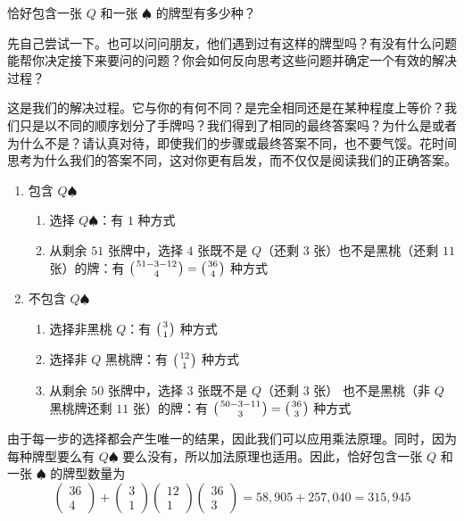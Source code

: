 \begin{example}

    恰好包含一张 $Q$ 和一张 $\spadesuit$ 的牌型有多少种？

    先自己尝试一下。也可以问问朋友，他们遇到过有这样的牌型吗？有没有什么问题能帮你决定接下来要问的问题？你会如何反向思考这些问题并确定一个有效的解决过程？

    这是我们的解决过程。它与你的有何不同？是完全相同还是在某种程度上等价？我们只是以不同的顺序划分了手牌吗？我们得到了相同的最终答案吗？为什么是或者为什么不是？请认真对待，即使我们的步骤或最终答案不同，也不要气馁。花时间思考为什么我们的答案不同，这对你更有启发，而不仅仅是阅读我们的正确答案。
    \begin{enumerate}
        \item 包含 $Q\spadesuit$
              \begin{enumerate}[label=(\alph*)]
                  \item 选择 $Q\spadesuit$：有 $1$ 种方式
                  \item 从剩余 $51$ 张牌中，选择 $4$ 张既不是 $Q$（还剩 $3$ 张）也不是黑桃（还剩 $11$ 张）的牌：有 $\big({51-3-12 \atop 4}\big)=\big({36 \atop 4}\big)$ 种方式
              \end{enumerate}
        \item 不包含 $Q\spadesuit$
              \begin{enumerate}[label=(\alph*)]
                  \item 选择非黑桃 $Q$：有 $\big({3 \atop 1}\big)$ 种方式
                  \item 选择非 $Q$ 黑桃牌：有 $\big({12 \atop 1}\big)$ 种方式
                  \item 从剩余 $50$ 张牌中，选择 $3$ 张既不是 $Q$（还剩 $3$ 张） 也不是黑桃（非 $Q$ 黑桃牌还剩 $11$ 张）的牌：有 $\big({50-3-11 \atop 3}\big)=\big({36 \atop 3}\big)$ 种方式
              \end{enumerate}
    \end{enumerate}
    由于每一步的选择都会产生唯一的结果，因此我们可以应用乘法原理。同时，因为每种牌型要么有 $Q\spadesuit$ 要么没有，所以加法原理也适用。因此，恰好包含一张 $Q$ 和一张 $\spadesuit$ 的牌型数量为
    \[\begin{pmatrix}
            36 \\
            4
        \end{pmatrix}+\begin{pmatrix}
            3 \\
            1
        \end{pmatrix}\begin{pmatrix}
            12 \\
            1
        \end{pmatrix}\begin{pmatrix}
            36 \\
            3
        \end{pmatrix} = 58,905 + 257,040 = 315,945\]


\end{example}
